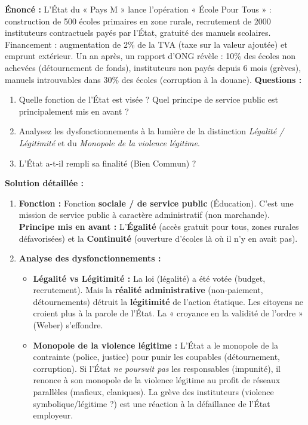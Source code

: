 \documentclass[11pt]{article}
\begin{document}
\begin{exoresolu}
\textbf{Énoncé :} L'État du « Pays M » lance l'opération « École Pour Tous » : construction de 500 écoles primaires en zone rurale, recrutement de 2000 instituteurs contractuels payés par l'État, gratuité des manuels scolaires. Financement : augmentation de 2\% de la TVA (taxe sur la valeur ajoutée) et emprunt extérieur. Un an après, un rapport d'ONG révèle : 10\% des écoles non achevées (détournement de fonds), instituteurs non payés depuis 6 mois (grèves), manuels introuvables dans 30\% des écoles (corruption à la douane).
\textbf{Questions :}
\begin{enumerate}
    \item Quelle fonction de l'État est visée ? Quel principe de service public est principalement mis en avant ?
    \item Analysez les dysfonctionnements à la lumière de la distinction \emph{Légalité / Légitimité} et du \emph{Monopole de la violence légitime}.
    \item L'État a-t-il rempli sa finalité (Bien Commun) ?
\end{enumerate}
\tcblower
\textbf{Solution détaillée :}
\begin{enumerate}
    \item \textbf{Fonction :} Fonction \textbf{sociale / de service public} (Éducation). C'est une mission de service public à caractère administratif (non marchande).
    \textbf{Principe mis en avant :} L'\textbf{Égalité} (accès gratuit pour tous, zones rurales défavorisées) et la \textbf{Continuité} (ouverture d'écoles là où il n'y en avait pas).
    \item \textbf{Analyse des dysfonctionnements :}
    \begin{itemize}
        \item \textbf{Légalité vs Légitimité :} La loi (légalité) a été votée (budget, recrutement). Mais la \textbf{réalité administrative} (non-paiement, détournements) détruit la \textbf{légitimité} de l'action étatique. Les citoyens ne croient plus à la parole de l'État. La « croyance en la validité de l'ordre » (Weber) s'effondre.
        \item \textbf{Monopole de la violence légitime :} L'État a le monopole de la contrainte (police, justice) pour punir les coupables (détournement, corruption). Si l'État \emph{ne poursuit pas} les responsables (impunité), il renonce à son monopole de la violence légitime au profit de réseaux parallèles (mafieux, claniques). La grève des instituteurs (violence symbolique/légitime ?) est une réaction à la défaillance de l'État employeur.

\end{itemize}
\end{enumerate}
\end{exoresolu}
\end{document}
